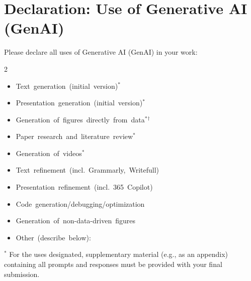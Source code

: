 \section*{Declaration: Use of Generative AI (GenAI)}

\vspace{1em}

Please declare all uses of Generative AI (GenAI) in your work:

{\scriptsize
\begin{multicols}{2}
    \begin{itemize}[label={}, itemsep=0pt, parsep=0pt]
        \item[$\square$] \mbox{Text generation (initial version)${}^\ast$}
        \item[$\square$] \mbox{Presentation generation (initial version)${}^\ast$}
        \item[$\square$] \mbox{Generation of figures directly from data${}^\ast{}^\dagger$}
        \item[$\square$] \mbox{Paper research and literature review${}^\ast$}
        \item[$\square$] \mbox{Generation of videos${}^\ast$}
        \item[$\blacksquare$] \mbox{Text refinement (incl. Grammarly, Writefull)}
        \item[$\square$] \mbox{Presentation refinement (incl. 365 Copilot)}
        \item[$\blacksquare$] \mbox{Code generation/debugging/optimization}
        \item[$\square$] \mbox{Generation of non-data-driven figures}
        \item[$\square$] \mbox{Other (describe below):}
    \end{itemize}
\end{multicols}
}
\vspace{-1em}
\fbox{
    \parbox[t][2cm][t]{\textwidth}{
        \vspace{0.5em}
        \hspace{0.5em} %
    }
}

{\footnotesize
    ${}^\ast$ For the uses designated, supplementary material (e.g., as an appendix) containing all prompts and responses must be provided with your final submission.
}

\vspace{2em}

